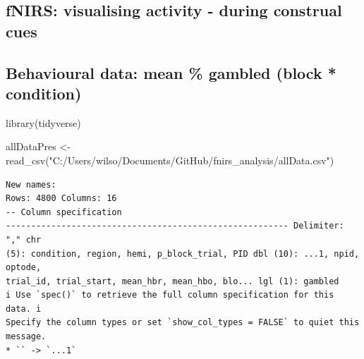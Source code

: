 \documentclass[
  letterpaper,
  DIV=11,
  numbers=noendperiod]{scrartcl}
\newenvironment{Shaded}{\begin{snugshade}}{\end{snugshade}}
\newcommand{\FunctionTok}[1]{\textcolor[rgb]{0.28,0.35,0.67}{#1}}
\newcommand{\NormalTok}[1]{\textcolor[rgb]{0.00,0.23,0.31}{#1}}
\newcommand{\OtherTok}[1]{\textcolor[rgb]{0.00,0.23,0.31}{#1}}
\newcommand{\StringTok}[1]{\textcolor[rgb]{0.13,0.47,0.30}{#1}}
\begin{document}
\hypertarget{fnirs-visualising-activity---during-construal-cues}{%
\subsection{fNIRS: visualising activity - during construal
cues}\label{fnirs-visualising-activity---during-construal-cues}}

\hypertarget{behavioural-data-mean-gambled-block-condition}{%
\subsection{Behavioural data: mean \% gambled (block *
condition)}\label{behavioural-data-mean-gambled-block-condition}}

\begin{Shaded}
\begin{Highlighting}[]
\FunctionTok{library}\NormalTok{(tidyverse)}

\NormalTok{allDataPres }\OtherTok{\textless{}{-}} \FunctionTok{read\_csv}\NormalTok{(}\StringTok{"C:/Users/wilso/Documents/GitHub/fnirs\_analysis/allData.csv"}\NormalTok{)}
\end{Highlighting}
\end{Shaded}

\begin{verbatim}
New names:
Rows: 4800 Columns: 16
-- Column specification
-------------------------------------------------------- Delimiter: "," chr
(5): condition, region, hemi, p_block_trial, PID dbl (10): ...1, npid, optode,
trial_id, trial_start, mean_hbr, mean_hbo, blo... lgl (1): gambled
i Use `spec()` to retrieve the full column specification for this data. i
Specify the column types or set `show_col_types = FALSE` to quiet this message.
* `` -> `...1`
\end{verbatim}
\end{document}
